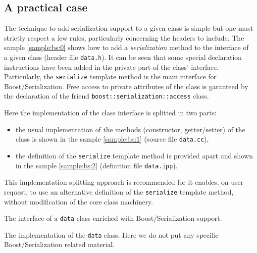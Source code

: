 \documentclass[a4paper,12pt]{article}
\newcommand{\basepath}{.}
\newcommand{\codingpath}{\basepath/coding}
\begin{document}
\subsection{A practical case}

The technique to add serialization  support to a given class is simple
but one must strictly respect a few rules, particularly concerning the
headers to  include. The sample  \ref{sample:bs:0} shows how to  add a
\emph{serialization} method to the  interface of a given class (header
file \texttt{data.h}).   It can be seen that  some special declaration
instructions  have  been added  in  the  private  part of  the  class'
interface. Particularly, the \texttt{serialize} template method is the
main  interface  for   Boost/Serialization.  Free  access  to  private
attributes of the class is  garanteed by the declaration of the friend
\texttt{boost::serialization::access} class.

Here the implementation of the class interface is splitted in two parts:
\begin{itemize}

\item   the  usual   implementation  of   the   methods  (constructor,
  getter/setter)   of    the   class   is   shown    in   the   sample
  \ref{sample:bs:1} (source file \texttt{data.cc}),

\item the definition of the \texttt{serialize}   template method is provided
  apart and shown    in   the   sample
  \ref{sample:bs:2} (definition file \texttt{data.ipp}).
\end{itemize}

This implementation  splitting approach is recommended  for it enables,
on   user  request,   to  use   an  alternative   definition   of  the
\texttt{serialize} template  method, without modification  of the core
class machinery.

\begin{sample}[h]
\VerbatimInput[frame=single,
numbers=left,
numbersep=2pt,
firstline=4,
lastline=55,
fontsize=\footnotesize,
showspaces=false]{\codingpath/data.h}
\caption{The interface of a \texttt{data} class enriched with
Boost/Serialization support.
}
\label{sample:bs:0}
\end{sample}

\begin{sample}[h]
\VerbatimInput[frame=single,
numbers=left,
numbersep=2pt,
firstline=1,
fontsize=\footnotesize,
showspaces=false]{\codingpath/data.cc}
\caption{The implementation of the \texttt{data} class. Here we do not
put any specific Boost/Serialization related material.
}
\label{sample:bs:1}
\end{sample}
\end{document}
